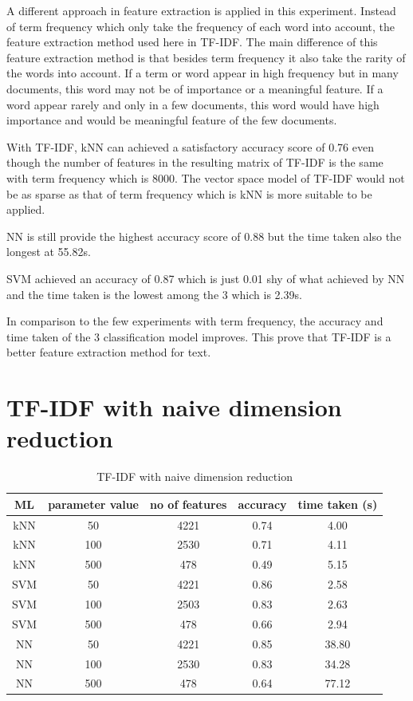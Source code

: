 A different approach in feature extraction is applied in this experiment. Instead of term frequency which only take the frequency of each word into account, the feature extraction method used here in TF-IDF. The main difference of this feature extraction method is that besides term frequency it also take the rarity of the words into account. If a term or word appear in high frequency but in many documents, this word may not be of importance or a meaningful feature. If a word appear rarely and only in a few documents, this word would have high importance and would be meaningful feature of the few documents.

With TF-IDF, kNN can achieved a satisfactory accuracy score of 0.76 even though the number of features in the resulting matrix of TF-IDF is the same with term frequency which is 8000. The vector space model of TF-IDF would not be as sparse as that of term frequency which is kNN is more suitable to be applied.

NN is still provide the highest accuracy score of 0.88 but the time taken also the longest at 55.82s.

SVM achieved an accuracy of 0.87 which is just 0.01 shy of what achieved by NN and the time taken is the lowest among the 3 which is 2.39s.

In comparison to the few experiments with term frequency, the accuracy and time taken of the 3 classification model improves. This prove that TF-IDF is a better feature extraction method for text.


\section{TF-IDF with naive dimension reduction}

\begin{table} [ht]
	\centering
	\begin{tabular}{|| c | c | c | c | c||}
		\hline
		ML & parameter value & no of features & accuracy & time taken (s) \\ [0.5ex]
		\hline\hline
		kNN & 50 & 4221 & 0.74 & 4.00 \\ 
		\hline
		kNN & 100 & 2530 & 0.71 & 4.11 \\ 
		\hline
		kNN & 500 & 478 & 0.49 & 5.15 \\ 
		\hline\hline
		SVM & 50 & 4221 & 0.86 & 2.58 \\
		\hline
		SVM & 100 & 2503 & 0.83 & 2.63 \\
		\hline
		SVM & 500 & 478 & 0.66 & 2.94 \\
		\hline\hline
		NN & 50 & 4221 & 0.85 & 38.80 \\
		\hline
		NN & 100 & 2530 & 0.83 & 34.28 \\
		\hline
		NN & 500 & 478 & 0.64 & 77.12 \\
		\hline\hline
	\end{tabular}
\caption{TF-IDF with naive dimension reduction}
\label{tbl:tfidfNaive}
\end{table}

